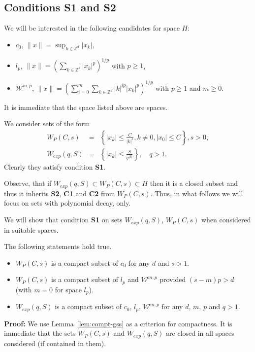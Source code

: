 \subsection{Conditions S1 and S2}
\label{subsec:ch-concond}
We will be interested in the following candidates for space $H$:
\begin{itemize}
\item $c_0$, $\|x\|=\sup_{k\in\mathbb Z^d} |x_k|$,
\item $l_p$, $\|x\|=\left(\sum_{k\in\mathbb Z^d}  |x_k|^p\right)^{1/p}$ with $p \geq 1$,
\item $\mathcal{W}^{m,p}$, $\|x\|=\left( \sum_{i=0}^m  \sum_{k\in\mathbb Z^d}  |k|^{ip} |x_k|^p \right)^{1/p}$ with $p \geq 1$ and $m \geq 0$.
\end{itemize}
It is immediate that the space listed above are \gss spaces.

We consider sets of the form
\begin{eqnarray*}
  W_{P}(C,s) &=&\left\{ |x_k| \leq \frac{C}{|k|^s}, k \neq 0,  |x_0| \leq C \right\}, s >0, \\
  W_{exp}(q,S)&=&\left\{ |x_k| \leq \frac{S}{q^{|k|}} \right\}, \quad q>1.
\end{eqnarray*}
Clearly they satisfy condition \textbf{S1}.

\begin{remark}
	Observe, that if $W_{exp}(q,S)\subset W_P(C,s)\subset H$ then it is a closed subset and thus it inherits {\bf S2}, {\bf C1} and {\bf C2} from $W_P(C,s)$. Thus, in what follows we will focus on sets with polynomial decay, only.
\end{remark}

We will show that condition \textbf{S1} on sets $W_{exp}(q,S)$, $W_P(C,s)$ when considered in suitable spaces.
\begin{theorem}
\label{thm:polexp-comp}
The following statements hold true.
\begin{itemize}
 \item $W_P(C,s)$ is a compact subset of  $c_0$ for any $d$ and $s>1$.
 \item $W_P(C,s)$ is a compact subset of $l_p$ and $\mathcal{W}^{m,p}$ provided $(s-m)p >d$ (with $m=0$ for space  $l_p$).
 \item  $W_{exp}(q,S)$ is a compact subset of  $c_0$, $l_p$, $\mathcal{W}^{m,p}$ for any $d$, $m$, $p$ and $q>1$.
\end{itemize}
\end{theorem}
\textbf{Proof:}
We  use Lemma~\ref{lem:compt-gss} as a criterion for compactness. It is immediate that the sets $ W_{P}(C,s)$ and $ W_{exp}(q,S)$ are closed in all spaces considered (if contained in them).

